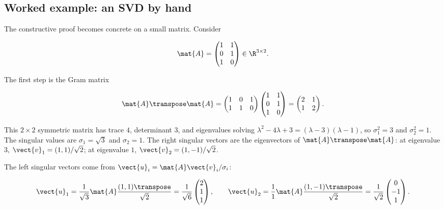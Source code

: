 \subsection{Worked example: an SVD by hand}

The constructive proof becomes concrete on a small matrix. Consider

\[
\mat{A} = \begin{pmatrix} 1 & 1 \\ 0 & 1 \\ 1 & 0 \end{pmatrix}
\in \R^{3 \times 2}.
\]

The first step is the Gram matrix

\[
\mat{A}\transpose \mat{A} = \begin{pmatrix} 1 & 0 & 1 \\ 1 & 1 & 0
\end{pmatrix} \begin{pmatrix} 1 & 1 \\ 0 & 1 \\ 1 & 0 \end{pmatrix}
= \begin{pmatrix} 2 & 1 \\ 1 & 2 \end{pmatrix}.
\]

This $2 \times 2$ symmetric matrix has trace $4$, determinant $3$,
and eigenvalues solving $\lambda^{2} - 4\lambda + 3 = (\lambda - 3)
(\lambda - 1)$, so $\sigma_{1}^{2} = 3$ and $\sigma_{2}^{2} = 1$.
The singular values are $\sigma_{1} = \sqrt{3}$ and $\sigma_{2} = 1$.
The right singular vectors are the eigenvectors of $\mat{A}\transpose
\mat{A}$: at eigenvalue $3$, $\vect{v}_{1} = (1, 1)/\sqrt{2}$; at
eigenvalue $1$, $\vect{v}_{2} = (1, -1)/\sqrt{2}$.

The left singular vectors come from $\vect{u}_{i} = \mat{A}
\vect{v}_{i}/\sigma_{i}$:

\[
\vect{u}_{1} = \frac{1}{\sqrt{3}} \mat{A} \frac{(1,1)\transpose}
{\sqrt{2}} = \frac{1}{\sqrt{6}} \begin{pmatrix} 2 \\ 1 \\ 1
\end{pmatrix}, \qquad
\vect{u}_{2} = \frac{1}{1} \mat{A} \frac{(1,-1)\transpose}{\sqrt{2}}
= \frac{1}{\sqrt{2}} \begin{pmatrix} 0 \\ -1 \\ 1 \end{pmatrix}.
\]

